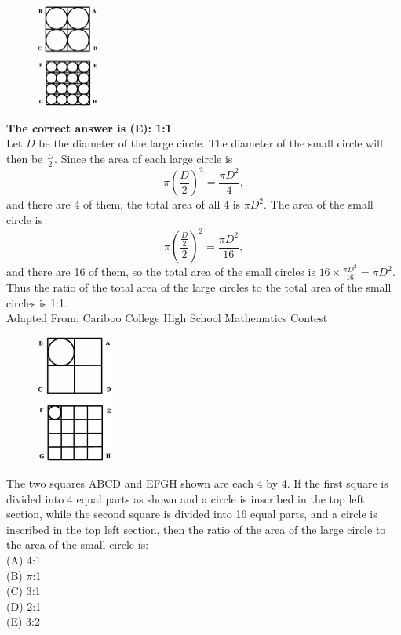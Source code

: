 \documentclass{article}
\begin{document}
\begin{figure}
	\includegraphics[width=20mm,viewport=66 28 464 700]{CCJPR74-20pic2.eps}
\end{figure}

\textbf{The correct answer is (E): 1:1}\\[1 ex]
Let $D$ be the diameter of the large circle. The diameter of the small circle will then be $\frac{D}{2}$. Since the area of each large circle is
\begin{equation*}
\pi(\frac{D}{2})^2=\frac{\pi D^{2}}{4},
\end{equation*}
and there are 4 of them, the total area of all 4 is $\pi D^2$. The area of the small circle is
\begin{equation*}
\pi(\frac{\frac{D}{2}}{2})^2=\frac{\pi D^{2}}{16},
\end{equation*}
and there are 16 of them, so the total area of the small circles is $16\times\frac{\pi D^{2}}{16}=\pi D^2$. Thus the ratio of the total area of the large circles to the total area of the small circles is 1:1.
\\[5 ex]

\scriptsize
Adapted From: Cariboo College High School Mathematics Contest

\normalsize
\begin{figure}
	\includegraphics[width=25mm,viewport=66 28 464 700]{CCJPR74-20pic.eps}
\end{figure}
The two squares ABCD and EFGH shown are each 4 by 4. If the first square is divided into 4 equal parts as shown and a circle is inscribed in the top left section, while the second square is divided into 16 equal parts, and a circle is inscribed in the top left section, then the ratio of the area of the large circle to the area of the small circle is:\\
(A) 4:1\\[1 ex]
(B) $\pi$:1\\[1 ex]
(C) 3:1\\[1 ex]
(D) 2:1\\[1 ex]
(E) 3:2\\
\end{document}
